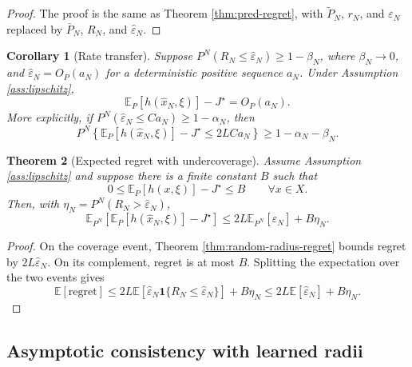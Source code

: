 \documentclass[11pt]{article}
\newtheorem{theorem}{Theorem}[section]
\newtheorem{corollary}[theorem]{Corollary}
\newcommand{\E}{\mathbb{E}}
\newcommand{\1}{\mathbf{1}}
\newcommand{\Ptil}{\widetilde P_N}
\newcommand{\Pbar}{\bar P_N}
\newcommand{\epshat}{\widehat\varepsilon_N}
\begin{document}
\begin{proof}
The proof is the same as Theorem \ref{thm:pred-regret}, with $\Ptil$, $r_N$, and $\varepsilon_N$ replaced by $\Pbar$, $R_N$, and $\epshat$.
\end{proof}

\begin{corollary}[Rate transfer]\label{cor:rate-transfer}
Suppose $P^N(R_N\le\epshat)\ge1-\beta_N$, where $\beta_N\to0$, and $\epshat=O_P(a_N)$ for a deterministic positive sequence $a_N$. Under Assumption \ref{ass:lipschitz},
\begin{equation}
    \E_P[h(\widehat x_N,\xi)]-J^\star=O_P(a_N).
\end{equation}
More explicitly, if $P^N(\epshat\le Ca_N)\ge1-\alpha_N$, then
\begin{equation}
P^N\left\{\E_P[h(\widehat x_N,\xi)]-J^\star\le2LCa_N\right\}
\ge1-\alpha_N-\beta_N.
\end{equation}
\end{corollary}

\begin{theorem}[Expected regret with undercoverage]\label{thm:expected-regret}
Assume Assumption \ref{ass:lipschitz} and suppose there is a finite constant $B$ such that
\begin{equation}
0\le \E_P[h(x,\xi)]-J^\star\le B\qquad\forall x\in X.
\end{equation}
Then, with $\eta_N=P^N(R_N>\epshat)$,
\begin{equation}\label{eq:expected-regret}
\E_{P^N}\left[\E_P[h(\widehat x_N,\xi)]-J^\star\right]
\le 2L\E_{P^N}[\epshat]+B\eta_N.
\end{equation}
\end{theorem}

\begin{proof}
On the coverage event, Theorem \ref{thm:random-radius-regret} bounds regret by $2L\epshat$. On its complement, regret is at most $B$. Splitting the expectation over the two events gives
\begin{equation}
\E[\mathrm{regret}]
\le2L\E[\epshat\1\{R_N\le\epshat\}]+B\eta_N
\le2L\E[\epshat]+B\eta_N.
\end{equation}
\end{proof}

\subsection{Asymptotic consistency with learned radii}
\end{document}

